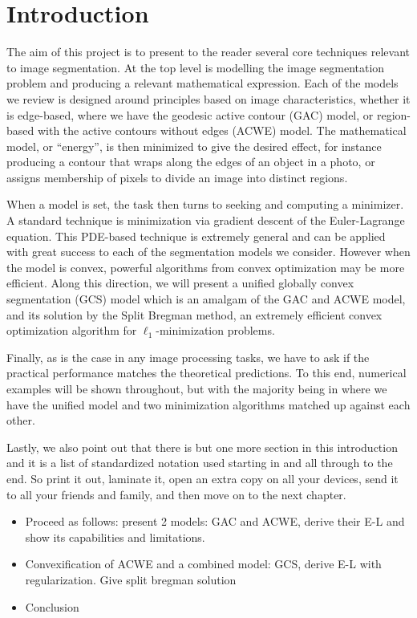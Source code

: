 \chapter{Introduction}
The aim of this project is to present to the reader several core techniques relevant to image segmentation. At the top level is modelling the image segmentation problem and producing a relevant mathematical expression. Each of the models we review is designed around principles based on image characteristics, whether it is edge-based, where we have the geodesic active contour (GAC) model, or region-based with the active contours without edges (ACWE) model. The mathematical model, or ``energy'', is then minimized to give the desired effect, for instance producing a contour that wraps along the edges of an object in a photo, or assigns membership of pixels to divide an image into distinct regions. 

When a model is set, the task then turns to seeking and computing a minimizer. A standard technique is minimization via gradient descent of the Euler-Lagrange equation. This PDE-based technique is extremely general and can be applied with great success to each of the segmentation models we consider. However when the model is convex, powerful algorithms from convex optimization may be more efficient. Along this direction, we will present a unified globally convex segmentation (GCS) model which is an amalgam of the GAC and ACWE model, and its solution by the Split Bregman method, an extremely efficient convex optimization algorithm for $\ell_1$-minimization problems.

Finally, as is the case in any image processing tasks, we have to ask if the practical performance matches the theoretical predictions. To this end, numerical examples will be shown throughout, but with the majority being in  where we have the unified model and two minimization algorithms matched up against each other.


Lastly, we also point out that there is but one more section in this introduction and it is a list of standardized notation used starting in  and all through to the end. So print it out, laminate it, open an extra copy on all your devices, send it to all your friends and family, and then move on to the next chapter. 


\begin{itemize}
	\item Proceed as follows: present 2 models: GAC and ACWE, derive their E-L and show its capabilities and limitations.
	
	\item Convexification of ACWE and a combined model: GCS, derive E-L with regularization. Give split bregman solution
	
	\item Conclusion
\end{itemize}

